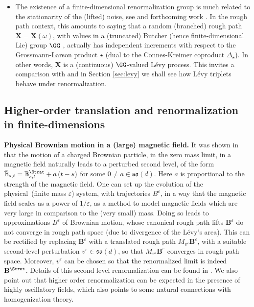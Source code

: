 \documentclass{article}
\begin{document}
\begin{itemize}
\item The existence of a finite-dimensional renormalization group is much
related to the stationarity of the (lifted) noise, see \cite{Hairer14} and forthcoming work
\cite{ChandraHairerForth}. In the rough path context, this amounts to saying that a
random (branched) rough path $\mathbf{X}=\mathbf{X}\left( \omega \right) $,
with values in a (truncated) Butcher (hence finite-dimensional Lie) group $\GG$%
, actually has independent increments with respect to the Grossmann-Larson
product $\star$ (dual to the Connes-Kreimer coproduct $\Delta _{\star}$). In
other words, $\mathbf{X}$ is a (continuous) $\GG$-valued L\'{e}vy process.
This invites a comparison with \cite{FrizShekhar14,Chevyrev15} and in Section \ref{sec:levy} 
we shall see how L\'{e}vy triplets behave under renormalization. 
\end{itemize}

\subsection{Higher-order translation and renormalization in finite-dimensions}  \label{sec:introex}

\bigskip \textbf{Physical Brownian motion in a (large) magnetic field.} It
was shown in \cite{FGL15} that the motion of a charged Brownian particle, in the
zero mass limit, in a magnetic field naturally leads to a perturbed second
level, of the form $\mathbb{\bar{B}}_{s,t}=\mathbb{B}_{s,t}^{\Strat}+a\left(
t-s\right) $ for some $0\neq a\in \mathfrak{so}\left( d\right) $. Here $a$ is
proportional to the strength of the magnetic field. One can set up the
evolution of the physical\ (finite mass $\varepsilon $) system, with
trajectories $B^{\varepsilon }$, in a way that the magnetic field scales
as a power of $1/\varepsilon $, as a method to model magnetic fields which are very large
in comparison to the (very small) mass. Doing so leads to approximations $%
B^{\varepsilon }$ of Brownian motion, whose canonical rough path lifts $%
\mathbf{B}^{\varepsilon }$ do not converge in rough path space (due to
divergence of the L\'{e}vy's area). This can be rectified by replacing $\mathbf{B%
}^{\varepsilon }$ with a translated rough path $M_{v^{\varepsilon }}\mathbf{B}^{\varepsilon }$, with a
suitable second-level perturbation $v^{\varepsilon }\in \mathfrak{so}\left( d\right) $,
so that $M_{v^{\varepsilon }}\mathbf{B}^{\varepsilon }$ converges in rough
path space. Moreover, $v^{\varepsilon }$ can be chosen so that the renormalized
limit is indeed $\mathbf{B}^{\Strat}$. Details of this second-level renormalization can be found in \cite{BCFForth}. We also point out that higher order renormalization can be expected in the presence of highly oscillatory fields, which also points to some natural connections with homogenization theory.
\end{document}
